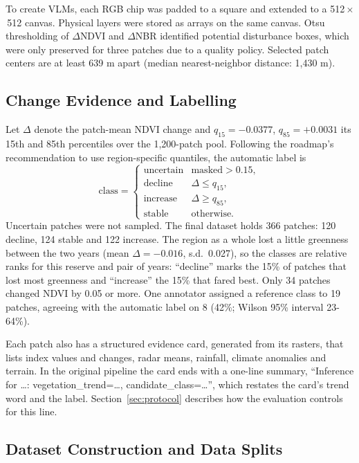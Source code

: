 \documentclass[11pt]{article}
\begin{document}
To create VLMs, each RGB chip was padded to a square and extended to a 512\,$\times$\,512 canvas. Physical layers were stored as arrays on the same canvas. Otsu thresholding of $\Delta$NDVI and $\Delta$NBR identified potential disturbance boxes, which were only preserved for three patches due to a quality policy. Selected patch centers are at least 639 m apart (median nearest-neighbor distance: 1,430 m).

\subsection{Change Evidence and Labelling}

Let $\Delta$ denote the patch-mean NDVI change and $q_{15}=-0.0377$,
$q_{85}=+0.0031$ its 15th and 85th percentiles over the 1,200-patch pool.
Following the roadmap's recommendation to use region-specific quantiles,
the automatic label is
\begin{equation}
\mathrm{class}=
\begin{cases}
\text{uncertain} & \text{masked}>0.15,\\
\text{decline} & \Delta\le q_{15},\\
\text{increase} & \Delta\ge q_{85},\\
\text{stable} & \text{otherwise.}
\end{cases}
\label{eq:label}
\end{equation}
Uncertain patches were not sampled. The final dataset holds 366 patches:
120 decline, 124 stable and 122 increase. The region as a whole lost a
little greenness between the two years (mean $\Delta=-0.016$, s.d.\
0.027), so the classes are relative ranks for this reserve and pair of
years: ``decline'' marks the 15\% of patches that lost most greenness
and ``increase'' the 15\% that fared best. Only 34 patches changed NDVI
by 0.05 or more. One annotator assigned a reference class to 19 patches,
agreeing with the automatic label on 8 (42\%; Wilson 95\% interval
23-64\%).

Each patch also has a structured evidence card, generated from its
rasters, that lists index values and changes, radar means, rainfall,
climate anomalies and terrain. In the original pipeline the card ends
with a one-line summary, ``Inference for \ldots: vegetation\_trend=\ldots,
candidate\_class=\ldots'', which restates the card's trend word and the
label. Section~\ref{sec:protocol} describes how the evaluation controls
for this line.

\subsection{Dataset Construction and Data Splits}
\end{document}
